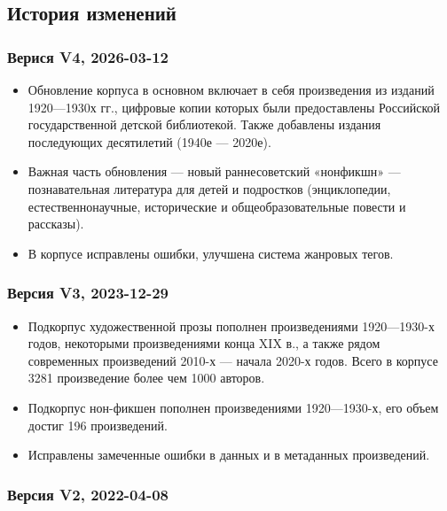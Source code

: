 \documentclass[
]{article}
\providecommand{\tightlist}{%
  \setlength{\itemsep}{0pt}\setlength{\parskip}{0pt}}
\begin{document}
\hypertarget{ux438ux441ux442ux43eux440ux438ux44f-ux438ux437ux43cux435ux43dux435ux43dux438ux439}{%
\subsection{История
изменений}\label{ux438ux441ux442ux43eux440ux438ux44f-ux438ux437ux43cux435ux43dux435ux43dux438ux439}}

\subsubsection{Верися V4, 2026-03-12}

\begin{itemize}
  \tightlist
\item Обновление корпуса в основном включает в себя произведения из
  изданий 1920—1930х гг., цифровые копии которых были предоставлены
  Российской государственной детской библиотекой. Также добавлены
  издания последующих десятилетий (1940е — 2020е).
\item  Важная часть обновления — новый раннесоветский «нонфикшн» —
  познавательная литература для детей и подростков (энциклопедии,
  естественнонаучные, исторические и общеобразовательные повести и
  рассказы).
\item  В корпусе исправлены ошибки, улучшена система жанровых тегов.
\end{itemize}

\hypertarget{ux432ux435ux440ux441ux438ux44f-v3-2023-12-29}{%
\subsubsection{Версия V3,
2023-12-29}\label{ux432ux435ux440ux441ux438ux44f-v3-2023-12-29}}

\begin{itemize}
\tightlist
\item
  Подкорпус художественной прозы пополнен произведениями 1920---1930-х
  годов, некоторыми произведениями конца XIX в., а также рядом
  современных произведений 2010-х --- начала 2020-х годов. Всего в
  корпусе 3281 произведение более чем 1000 авторов.
\item
  Подкорпус нон-фикшен пополнен произведениями 1920---1930-х, его объем
  достиг 196 произведений.
\item
  Исправлены замеченные ошибки в данных и в метаданных произведений.
\end{itemize}

\hypertarget{ux432ux435ux440ux441ux438ux44f-v2-2022-04-08}{%
\subsubsection{Версия V2,
2022-04-08}\label{ux432ux435ux440ux441ux438ux44f-v2-2022-04-08}}
\end{document}
